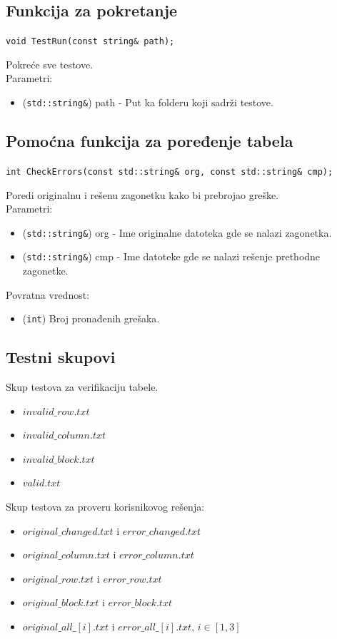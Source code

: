\documentclass[a4paper]{article}
\begin{document}
    \subsection{Funkcija za pokretanje}
    \texttt{void TestRun(const string\& path);}
    \par Pokreće sve testove.\\
    Parametri:
    \begin{itemize}
        \item (\texttt{std::string\&}) path - Put ka folderu koji sadrži testove.
    \end{itemize}
    \subsection{Pomoćna funkcija za poređenje tabela}
    {\parindent0pt
    \texttt{int CheckErrors(const std::string\& org, const std::string\& cmp);}
    }
    \par Poredi originalnu i rešenu zagonetku kako bi prebrojao greške.\\
    Parametri:
    \begin{itemize}
        \item (\texttt{std::string\&}) org - Ime originalne datoteka gde se nalazi zagonetka.
        \item (\texttt{std::string\&}) cmp - Ime datoteke gde se nalazi rešenje prethodne zagonetke.
    \end{itemize}
    Povratna vrednost:
    \begin{itemize}
        \item (\texttt{int}) Broj pronađenih grešaka.
    \end{itemize}
    \subsection{Testni skupovi}
    {\parindent0pt
        Skup testova za verifikaciju tabele.
        \begin{itemize}
            \item $invalid\_row.txt$
            \item $invalid\_column.txt$
            \item $invalid\_block.txt$
            \item $valid.txt$
        \end{itemize}
        \par Skup testova za proveru korisnikovog rešenja:
        \begin{itemize}
            \item $original\_changed.txt$ i $error\_changed.txt$
            \item $original\_column.txt$ i $error\_column.txt$
            \item $original\_row.txt$ i $error\_row.txt$
            \item $original\_block.txt$ i $error\_block.txt$
            \item $original\_all\_[i].txt$ i $error\_all\_[i].txt$, $i\in[1,3]$
        \end{itemize}    
    }
\end{document}
